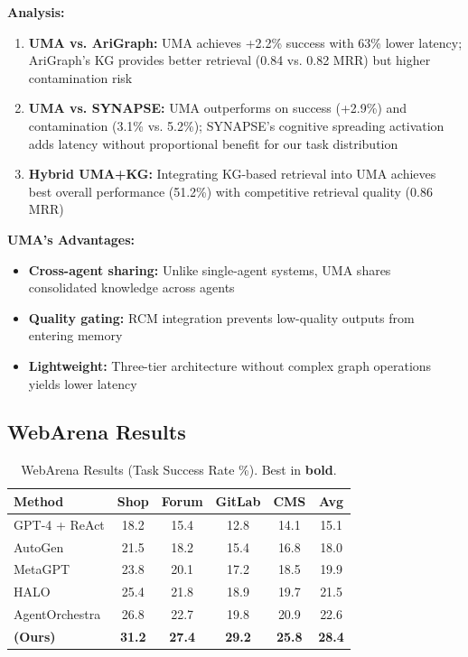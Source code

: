 \documentclass{article}
\theoremstyle{plain}
\theoremstyle{definition}
\theoremstyle{remark}
\begin{document}
\textbf{Analysis:}
\begin{enumerate}[nosep,leftmargin=*]
	\item \textbf{UMA vs. AriGraph:} UMA achieves +2.2\% success with 63\% lower latency; AriGraph's KG provides better retrieval (0.84 vs. 0.82 MRR) but higher contamination risk
	\item \textbf{UMA vs. SYNAPSE:} UMA outperforms on success (+2.9\%) and contamination (3.1\% vs. 5.2\%); SYNAPSE's cognitive spreading activation adds latency without proportional benefit for our task distribution
	\item \textbf{Hybrid UMA+KG:} Integrating KG-based retrieval into UMA achieves best overall performance (51.2\%) with competitive retrieval quality (0.86 MRR)
\end{enumerate}

\textbf{UMA's Advantages:}
\begin{itemize}[nosep,leftmargin=*]
	\item \textbf{Cross-agent sharing:} Unlike single-agent systems, UMA shares consolidated knowledge across agents
	\item \textbf{Quality gating:} RCM integration prevents low-quality outputs from entering memory
	\item \textbf{Lightweight:} Three-tier architecture without complex graph operations yields lower latency
\end{itemize}

\subsection{WebArena Results}
\begin{table}[h]
	\caption{WebArena Results (Task Success Rate \%). Best in \textbf{bold}.}
	\label{tab:webarena}
	\centering
	\small
	\begin{tabular}{@{}lccccc@{}}
		\toprule
		\textbf{Method} & \textbf{Shop} & \textbf{Forum} & \textbf{GitLab} & \textbf{CMS} & \textbf{Avg} \\
		\midrule
		GPT-4 + ReAct & 18.2 & 15.4 & 12.8 & 14.1 & 15.1 \\
		AutoGen & 21.5 & 18.2 & 15.4 & 16.8 & 18.0 \\
		MetaGPT & 23.8 & 20.1 & 17.2 & 18.5 & 19.9 \\
		HALO & 25.4 & 21.8 & 18.9 & 19.7 & 21.5 \\
		AgentOrchestra & 26.8 & 22.7 & 19.8 & 20.9 & 22.6 \\
		\textbf{\amore{} (Ours)} & \textbf{31.2} & \textbf{27.4} & \textbf{29.2} & \textbf{25.8} & \textbf{28.4} \\
		\bottomrule
	\end{tabular}
\end{table}
\end{document}
